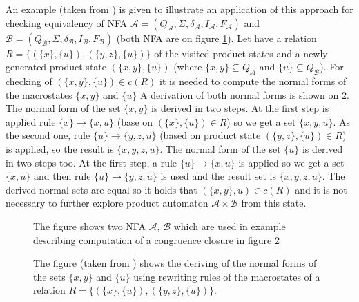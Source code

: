 An example (taken from \cite{popl13}) is given to illustrate an application of this approach for checking equivalency of 
NFA $\mathcal{A}=(Q_\mathcal{A},\Sigma,\delta_\mathcal{A},I_\mathcal{A},F_\mathcal{A})$ 
and $\mathcal{B}=(Q_\mathcal{B},\Sigma,\delta_\mathcal{B},I_\mathcal{B},F_\mathcal{B})$ (both NFA are on figure \ref{figHKCex}). 
Let have a relation $R=\{(\{x\},\{u\}),(\{y,z\},\{u\})\}$ of the visited product states and a newly generated product state 
$(\{x,y\},\{u\})$ (where $\{x,y\}\subseteq Q_\mathcal{A}$ and 
$\{u\} \subseteq Q_\mathcal{B}$). For checking of $(\{x,y\},\{u\})\in c(R)$ it is needed to compute the normal forms of the macrostates $\{x,y\}$ and $\{u\}$ 
A derivation of both normal forms is shown on \ref{figHKCRew}. 
The normal form of the set $\{x,y\}$ is derived in two steps.
At the first step is applied rule $\{x\}\rightarrow\{x,u\}$ (base on $(\{x\},\{u\})\in R$) so we get a set $\{x,y,u\}$. As the second one, rule 
$\{u\}\rightarrow\{y,z,u\}$ (based on product state $(\{y,z\},\{u\})\in R$) is applied, so the result is $\{x,y,z,u\}$. The normal form of the set $\{u\}$
is derived in two steps too. At the first step, a rule $\{u\}\rightarrow\{x,u\}$ is applied so we get a set $\{x,u\}$ and then rule 
$\{u\}\rightarrow\{y,z,u\}$  is used and the result set is $\{x,y,z,u\}$. The derived normal sets are equal so it holds that $(\{x,y\},u)\in c(R)$ and
it is not necessary to further explore product automaton $\mathcal{A}\times \mathcal{B}$ from this state.

\begin{figure}[bt]
\begin{center}
  
  
    \caption{The figure shows two NFA $\mathcal{A}$, $\mathcal{B}$ 
      which are used in example describing computation of a congruence closure in figure \ref{figHKCRew}}
		\label{figHKCex}
\end{center}
\end{figure}

\begin{figure}[bt]
  \begin{center}
    
    \caption{The figure (taken from \cite{popl13}) shows the deriving of the normal forms of the sets $\{x,y\}$ and $\{u\}$ using rewriting
      rules of the macrostates of a relation $R=\{(\{x\},\{u\}),(\{y,z\},\{u\})\}$.}
    \label{figHKCRew}
  \end{center}
\end{figure}

